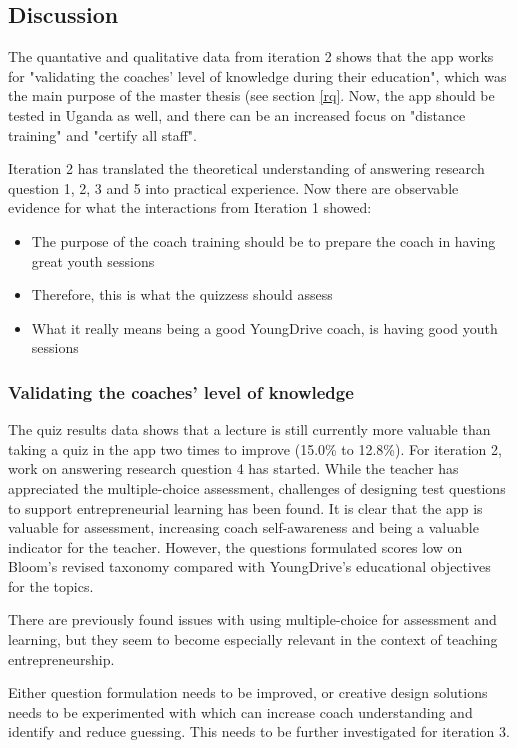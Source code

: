 \subsection{Discussion}

The quantative and qualitative data from iteration 2 shows that the app works for "validating the coaches' level of knowledge during their education", which was the main purpose of the master thesis (see section \ref{rq}. Now, the app should be tested in Uganda as well, and there can be an increased focus on "distance training" and "certify all staff".

Iteration 2 has translated the theoretical understanding of answering research question 1, 2, 3 and 5 into practical experience. Now there are observable evidence for what the interactions from Iteration 1 showed:

\begin{itemize}
\item The purpose of the coach training should be to prepare the coach in having great youth sessions
\item Therefore, this is what the quizzess should assess
\item What it really means being a good YoungDrive coach, is having good youth sessions
\end{itemize}

\subsubsection{Validating the coaches' level of knowledge}
The quiz results data shows that a lecture is still currently more valuable than taking a quiz in the app two times to improve (15.0\% to 12.8\%). For iteration 2, work on answering research question 4 has started. While the teacher has appreciated the multiple-choice assessment, challenges of designing test questions to support entrepreneurial learning has been found. It is clear that the app is valuable for assessment, increasing coach self-awareness and being a valuable indicator for the teacher. However, the questions formulated scores low on Bloom's revised taxonomy \cite{bloom} compared with YoungDrive's educational objectives for the topics.

There are previously found issues with using multiple-choice for assessment and learning, but they seem to become especially relevant in the context of teaching entrepreneurship.

Either question formulation needs to be improved, or creative design solutions needs to be experimented with which can increase coach understanding and identify and reduce guessing. This needs to be further investigated for iteration 3.

